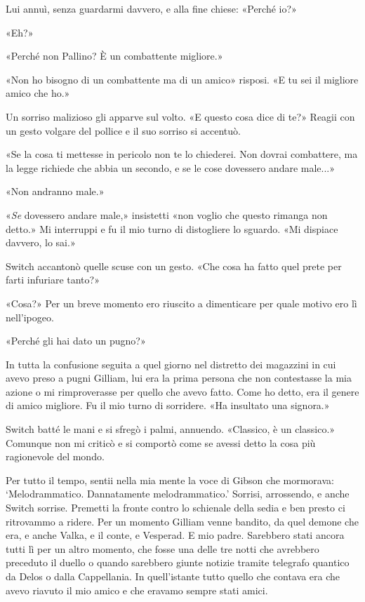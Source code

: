 Lui annuì, senza guardarmi davvero, e alla fine chiese: «Perché io?»

«Eh?»

«Perché non Pallino? È un combattente migliore.»

«Non ho bisogno di un combattente ma di un amico» risposi. «E tu sei il
migliore amico che ho.»

Un sorriso malizioso gli apparve sul volto. «E questo cosa dice di te?»
Reagii con un gesto volgare del pollice e il suo sorriso si accentuò.

«Se la cosa ti mettesse in pericolo non te lo chiederei. Non dovrai
combattere, ma la legge richiede che abbia un secondo, e se le cose
dovessero andare male...»

«Non andranno male.»

«\emph{Se} dovessero andare male,» insistetti «non voglio che questo
rimanga non detto.» Mi interruppi e fu il mio turno di distogliere lo
sguardo. «Mi dispiace davvero, lo sai.»

Switch accantonò quelle scuse con un gesto. «Che cosa ha fatto quel
prete per farti infuriare tanto?»

«Cosa?» Per un breve momento ero riuscito a dimenticare per quale motivo
ero lì nell'ipogeo.

«Perché gli hai dato un pugno?»

In tutta la confusione seguita a quel giorno nel distretto dei magazzini
in cui avevo preso a pugni Gilliam, lui era la prima persona che non
contestasse la mia azione o mi rimproverasse per quello che avevo fatto.
Come ho detto, era il genere di amico migliore. Fu il mio turno di
sorridere. «Ha insultato una signora.»

Switch batté le mani e si sfregò i palmi, annuendo. «Classico, è un
classico.» Comunque non mi criticò e si comportò come se avessi detto la
cosa più ragionevole del mondo.

Per tutto il tempo, sentii nella mia mente la voce di Gibson che
mormorava: `Melodrammatico. Dannatamente melodrammatico.' Sorrisi,
arrossendo, e anche Switch sorrise. Premetti la fronte contro lo
schienale della sedia e ben presto ci ritrovammo a ridere. Per un
momento Gilliam venne bandito, da quel demone che era, e anche Valka, e
il conte, e Vesperad. E mio padre. Sarebbero stati ancora tutti lì per
un altro momento, che fosse una delle tre notti che avrebbero preceduto
il duello o quando sarebbero giunte notizie tramite telegrafo quantico
da Delos o dalla Cappellania. In quell'istante tutto quello che contava
era che avevo riavuto il mio amico e che eravamo sempre stati amici.

